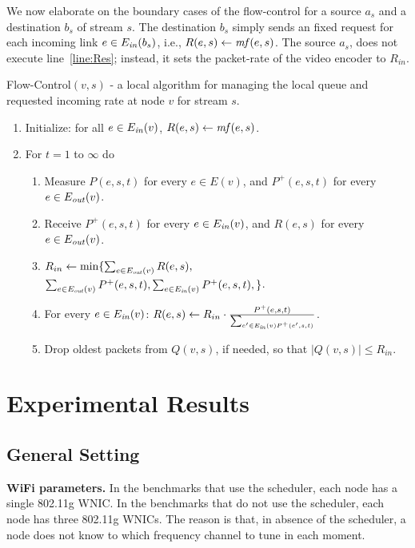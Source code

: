 \documentclass[12pt]{article}
\newenvironment{proof sketch}[1]{\noindent {\emph{Proof sketch of #1:}}}{\hfill \qed}
\newcommand{\mf}{\text{\emph{mf}}}
\newcommand{\Ein}{E_{\text{\emph{in}}}}
\newcommand{\Eout}{E_{\text{\emph{out}}}}
\begin{document}
We now elaborate on the boundary cases of the flow-control for a
source $a_s$ and a destination $b_s$ of stream $s$.  The destination
$b_s$ simply sends an fixed request for each incoming link $e\in \Ein(b_s)$, i.e.,
$R(e,s)\gets \mf(e,s)$.  The source $a_s$, does not execute
line~\ref{line:Res}; instead, it sets the packet-rate of the video
encoder to $R_{in}$.


\begin{algorithm}
  \caption{Flow-Control$(v,s)$ - a local algorithm for managing the
    local queue and requested incoming rate at node $v$ for stream
    $s$.}
\label{alg:FC}
  \begin{enumerate}
  \item Initialize: for all $e\in \Ein(v)$, $R(e,s)\gets \mf(e,s)$.
  \item For $t=1$ to $\infty$ do
    \begin{enumerate}
    \item Measure $P(e,s,t)$ for every $e\in E(v)$, and $P^+(e,s,t)$ for every $e\in\Eout(v)$.
    \item Receive $P^+(e,s,t)$ for every $e\in\Ein(v)$, and $R(e,s)$ for every $e\in \Eout(v)$.
    \item \label{line:Rin}
$R_{in} \gets \min\{\sum_{e\in\Eout(v)} R(e,s),$\\
$ \sum_{e\in\Eout(v)} P^+(e,s,t), \sum_{e\in\Ein(v)} P^+(e,s,t),
            \}$.
          \item \label{line:Res}
For every $e\in\Ein(v)$: $R(e,s) \gets R_{in} \cdot
            \frac{P^+(e,s,t)}{\sum_{e'\in\Ein(v) P^+(e',s,t)}}$.
            \item Drop oldest packets from $Q(v,s)$, if needed, so
              that $|Q(v,s)|\leq R_{in}$.
    \end{enumerate}
  \end{enumerate}
\end{algorithm}

\section{Experimental Results}
\subsection{General Setting}

\noindent
\textbf{WiFi parameters.}  In the benchmarks that use the scheduler,
each node has a single 802.11g WNIC.  In the benchmarks that do not
use the scheduler, each node has three 802.11g WNICs.  The reason is
that, in absence of the scheduler, a node does not know to which
frequency channel to tune in each moment.
\end{document}
